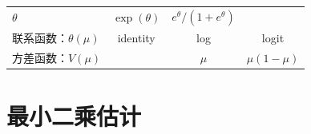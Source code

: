 \documentclass[12pt,a4paper,UTF8,twoside]{book}
\theoremstyle{definition}
\theoremstyle{definition}
\theoremstyle{definition}
\theoremstyle{remark}
\begin{document}
\begin{longtable}[]{@{}lccc@{}}
\begin{minipage}[t]{0.22\columnwidth}
\(\theta\)\strut
\end{minipage} & \begin{minipage}[t]{0.22\columnwidth}\centering
\(\exp(\theta)\)\strut
\end{minipage} & \begin{minipage}[t]{0.22\columnwidth}\centering
\(e^{\theta}/(1+e^{\theta})\)\strut
\end{minipage}\tabularnewline
\begin{minipage}[t]{0.21\columnwidth}\raggedright
联系函数：\(\theta(\mu)\)\strut
\end{minipage} & \begin{minipage}[t]{0.22\columnwidth}\centering
identity\strut
\end{minipage} & \begin{minipage}[t]{0.22\columnwidth}\centering
log\strut
\end{minipage} & \begin{minipage}[t]{0.22\columnwidth}\centering
logit\strut
\end{minipage}\tabularnewline
\begin{minipage}[t]{0.21\columnwidth}\raggedright
方差函数：\(V(\mu)\)\strut
\end{minipage} & \begin{minipage}[t]{0.22\columnwidth}\centering
1\strut
\end{minipage} & \begin{minipage}[t]{0.22\columnwidth}\centering
\(\mu\)\strut
\end{minipage} & \begin{minipage}[t]{0.22\columnwidth}\centering
\(\mu(1-\mu)\)\strut
\end{minipage}\tabularnewline
\bottomrule
\end{longtable}

\hypertarget{sec:lse}{%
\section{最小二乘估计}\label{sec:lse}}
\end{document}
